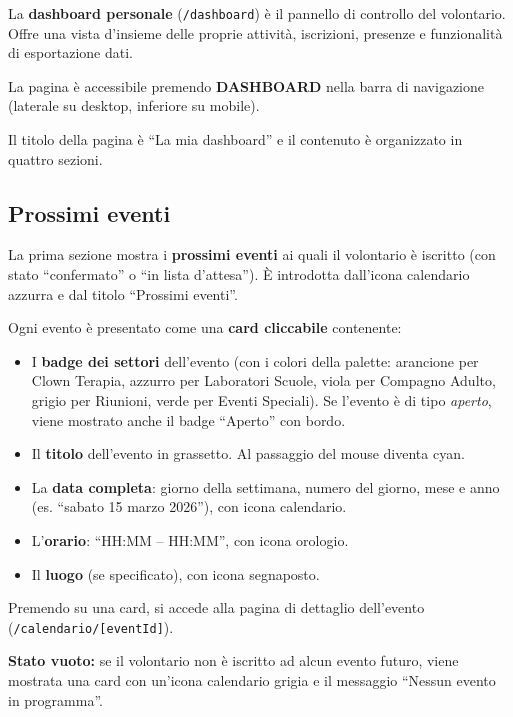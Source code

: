 \documentclass[a4paper,11pt,oneside]{book}
\newcommand{\menuitem}[1]{\textsf{\textbf{#1}}}
\newcommand{\percorso}[1]{\textcolor{namoCyan}{\texttt{#1}}}
\begin{document}
La \textbf{dashboard personale} (\percorso{/dashboard}) \`e il pannello di controllo del volontario. Offre una vista d'insieme delle proprie attivit\`a, iscrizioni, presenze e funzionalit\`a di esportazione dati.

La pagina \`e accessibile premendo \menuitem{DASHBOARD} nella barra di navigazione (laterale su desktop, inferiore su mobile).

Il titolo della pagina \`e ``La mia dashboard'' e il contenuto \`e organizzato in quattro sezioni.

\subsection{Prossimi eventi}
\label{sec:dashboard-prossimi}

La prima sezione mostra i \textbf{prossimi eventi} ai quali il volontario \`e iscritto (con stato ``confermato'' o ``in lista d'attesa''). \`E introdotta dall'icona calendario \textcolor{namoCyan}{azzurra} e dal titolo ``Prossimi eventi''.

Ogni evento \`e presentato come una \textbf{card cliccabile} contenente:
\begin{itemize}[leftmargin=1.5em]
  \item I \textbf{badge dei settori} dell'evento (con i colori della palette: arancione per Clown Terapia, azzurro per Laboratori Scuole, viola per Compagno Adulto, grigio per Riunioni, verde per Eventi Speciali). Se l'evento \`e di tipo \textit{aperto}, viene mostrato anche il badge ``Aperto'' con bordo.
  \item Il \textbf{titolo} dell'evento in grassetto. Al passaggio del mouse diventa \textcolor{namoCyan}{cyan}.
  \item La \textbf{data completa}: giorno della settimana, numero del giorno, mese e anno (es. ``sabato 15 marzo 2026''), con icona calendario.
  \item L'\textbf{orario}: ``HH:MM -- HH:MM'', con icona orologio.
  \item Il \textbf{luogo} (se specificato), con icona segnaposto.
\end{itemize}

Premendo su una card, si accede alla pagina di dettaglio dell'evento (\percorso{/calendario/[eventId]}).

\textbf{Stato vuoto:} se il volontario non \`e iscritto ad alcun evento futuro, viene mostrata una card con un'icona calendario grigia e il messaggio ``Nessun evento in programma''.
\end{document}
